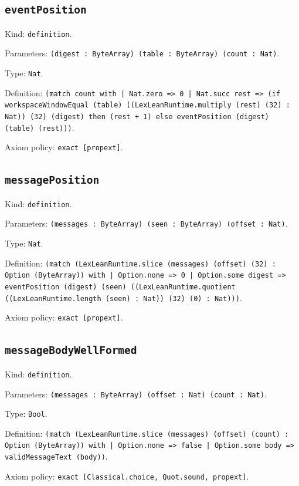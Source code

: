 \documentclass[11pt]{article}
\begin{document}
\subsection*{\texttt{eventPosition}}
\noindent Kind: \texttt{definition}.\par
\noindent Parameters: \texttt{(digest : ByteArray) (table : ByteArray) (count : Nat)}.\par
\noindent Type: \texttt{Nat}.\par
\noindent Definition: \texttt{(match count with | Nat.zero => 0 | Nat.succ rest => (if workspaceWindowEqual (table) ((LexLeanRuntime.multiply (rest) (32) : Nat)) (32) (digest) then (rest + 1) else eventPosition (digest) (table) (rest)))}.\par
\noindent Axiom policy: \texttt{exact [propext]}.\par
\subsection*{\texttt{messagePosition}}
\noindent Kind: \texttt{definition}.\par
\noindent Parameters: \texttt{(messages : ByteArray) (seen : ByteArray) (offset : Nat)}.\par
\noindent Type: \texttt{Nat}.\par
\noindent Definition: \texttt{(match (LexLeanRuntime.slice (messages) (offset) (32) : Option (ByteArray)) with | Option.none => 0 | Option.some digest => eventPosition (digest) (seen) ((LexLeanRuntime.quotient ((LexLeanRuntime.length (seen) : Nat)) (32) (0) : Nat)))}.\par
\noindent Axiom policy: \texttt{exact [propext]}.\par
\subsection*{\texttt{messageBodyWellFormed}}
\noindent Kind: \texttt{definition}.\par
\noindent Parameters: \texttt{(messages : ByteArray) (offset : Nat) (count : Nat)}.\par
\noindent Type: \texttt{Bool}.\par
\noindent Definition: \texttt{(match (LexLeanRuntime.slice (messages) (offset) (count) : Option (ByteArray)) with | Option.none => false | Option.some body => validMessageText (body))}.\par
\noindent Axiom policy: \texttt{exact [Classical.choice, Quot.sound, propext]}.\par
\end{document}

